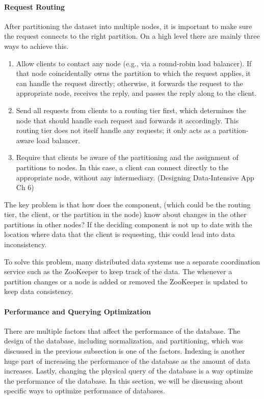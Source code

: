 \paragraph{Request Routing}
After partitioning the dataset into multiple nodes, it is important to make sure the request connects to the right partition. On a high level there are mainly three ways to achieve this. 
\begin{enumerate}
    \item Allow clients to contact any node (e.g., via a round-robin load balancer). If that node coincidentally owns the partition to which the request applies, it can handle the request directly; otherwise, it forwards the request to the appropriate node, receives the reply, and passes the reply along to the client.
    \item Send all requests from clients to a routing tier first, which determines the node that should handle each request and forwards it accordingly. This routing tier does not itself handle any requests; it only acts as a partition-aware load balancer.
    \item Require that clients be aware of the partitioning and the assignment of partitions to nodes. In this case, a client can connect directly to the appropriate node, without any intermediary. (Designing Data-Intensive App Ch 6)
\end{enumerate}

The key problem is that how does the component, (which could be the routing tier, the client, or the partition in the node) know about changes in the other partitions in other nodes? If the deciding component is not up to date with the location where data that the client is requesting, this could lead into data inconsistency. 

To solve this problem, many distributed data systems use a separate coordination service such as the ZooKeeper to keep track of the data. The whenever a partition changes or a node is added or removed the ZooKeeper is updated to keep data consistency. 

\paragraph{Performance and Querying Optimization}
There are multiple factors that affect the performance of the database. The design of the database, including normalization, and partitioning, which was discussed in the previous subsection is one of the factors. Indexing is another huge part of increasing the performance of the database as the amount of data increases. Lastly, changing the physical query of the database is a way optimize the performance of the database. In this section, we will be discussing about specific ways to optimize performance of databases.

